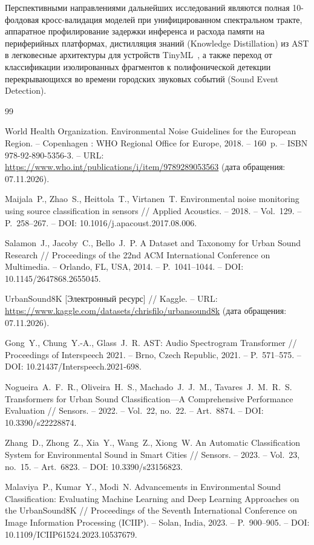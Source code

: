 \documentclass[pdflatex,sn-mathphys-num]{sn-jnl}
\begin{document}
Перспективными направлениями дальнейших исследований являются полная 10-фолдовая кросс-валидация моделей при унифицированном спектральном тракте, аппаратное профилирование задержки инференса и расхода памяти на периферийных платформах, дистилляция знаний (Knowledge Distillation) из AST в легковесные архитектуры для устройств TinyML~\cite{ref9,ref10}, а также переход от классификации изолированных фрагментов к полифонической детекции перекрывающихся во времени городских звуковых событий (Sound Event Detection).

\newpage
\begin{thebibliography}{99}

World Health Organization. Environmental Noise Guidelines for the European Region. -- Copenhagen : WHO Regional Office for Europe, 2018. -- 160~p. -- ISBN 978-92-890-5356-3. -- URL: \url{https://www.who.int/publications/i/item/9789289053563} (дата обращения: 07.11.2026).

Maijala~P., Zhao~S., Heittola~T., Virtanen~T. Environmental noise monitoring using source classification in sensors // Applied Acoustics. -- 2018. -- Vol.~129. -- P.~258--267. -- DOI: 10.1016/j.apacoust.2017.08.006.

Salamon~J., Jacoby~C., Bello~J.~P. A Dataset and Taxonomy for Urban Sound Research // Proceedings of the 22nd ACM International Conference on Multimedia. -- Orlando, FL, USA, 2014. -- P.~1041--1044. -- DOI: 10.1145/2647868.2655045.

UrbanSound8K [Электронный ресурс] // Kaggle. -- URL: \url{https://www.kaggle.com/datasets/chrisfilo/urbansound8k} (дата обращения: 07.11.2026).

Gong~Y., Chung~Y.-A., Glass~J.~R. AST: Audio Spectrogram Transformer // Proceedings of Interspeech 2021. -- Brno, Czech Republic, 2021. -- P.~571--575. -- DOI: 10.21437/Interspeech.2021-698.

Nogueira~A.~F.~R., Oliveira~H.~S., Machado~J.~J.~M., Tavares~J.~M.~R.~S. Transformers for Urban Sound Classification---A Comprehensive Performance Evaluation // Sensors. -- 2022. -- Vol.~22, no.~22. -- Art.~8874. -- DOI: 10.3390/s22228874.

Zhang~D., Zhong~Z., Xia~Y., Wang~Z., Xiong~W. An Automatic Classification System for Environmental Sound in Smart Cities // Sensors. -- 2023. -- Vol.~23, no.~15. -- Art.~6823. -- DOI: 10.3390/s23156823.

Malaviya~P., Kumar~Y., Modi~N. Advancements in Environmental Sound Classification: Evaluating Machine Learning and Deep Learning Approaches on the UrbanSound8K // Proceedings of the Seventh International Conference on Image Information Processing (ICIIP). -- Solan, India, 2023. -- P.~900--905. -- DOI: 10.1109/ICIIP61524.2023.10537679.


\end{thebibliography}
\end{document}
